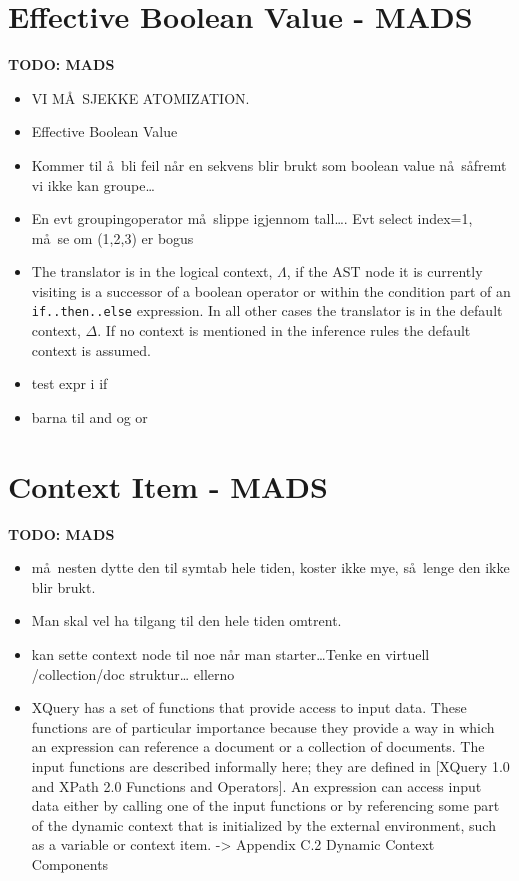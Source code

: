 \section{Effective Boolean Value - {MADS}}
\label{sect:disc:effBool}
\textbf{\LARGE TODO: {MADS}}
\begin{itemize}
\item VI M\AA~SJEKKE ATOMIZATION.
\item Effective Boolean Value
\item Kommer til \aa~bli feil n\aa r en sekvens blir brukt som boolean value n\aa~s\aa fremt vi ikke kan groupe\ldots
\item En evt groupingoperator m\aa~slippe igjennom tall\ldots. Evt select index=1, m\aa~se om (1,2,3) er bogus
\item The translator is in the logical context, $\Lambda$, if the AST node it is currently visiting is a successor
of a boolean operator or within the condition part of an \texttt{if..then..else} expression. In all other cases the
translator is in the default context, $\Delta$. If no context is mentioned in the inference rules the default
context is assumed. 
\item test expr i if
\item barna til and og or
\end{itemize}

\section{Context Item - {MADS}}
\label{sect:disc:ctxItem}
\textbf{\LARGE TODO: {MADS}}
\begin{itemize}
  \item m\aa~nesten dytte den til symtab hele tiden, koster ikke mye, s\aa~lenge den ikke blir brukt.
  \item Man skal vel ha tilgang til den hele tiden omtrent.
  \item kan sette context node til noe n\aa r man starter\ldots Tenke en virtuell /collection/doc struktur\ldots
  ellerno
  \item XQuery has a set of functions that provide access to input data. These functions are of particular
  importance because they provide a way in which an expression can reference a document or a collection of
  documents. The input functions are described informally here; they are defined in [XQuery 1.0 and XPath 2.0
  Functions and Operators]. An expression can access input data either by calling one of the input functions or by
  referencing some part of the dynamic context that is initialized by the external environment, such as a variable
  or context item. -> Appendix C.2 Dynamic Context Components
\end{itemize}


